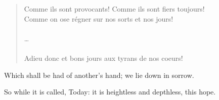 \begin{quote} 
\begin{spacing}{1.1}
Comme ils sont provocants! Comme ils sont fiers toujours! \\
Comme on ose r\'{e}gner sur nos sorts et nos jours! \\
\\
\dots \\
\\
Adieu donc et bons jours aux tyrans de nos coeurs! \\
\end{spacing}
\end{quote}
Which shall be had of another's hand; we lie down in sorrow.

So while it is called, Today: it is heightless and depthless, this hope.


